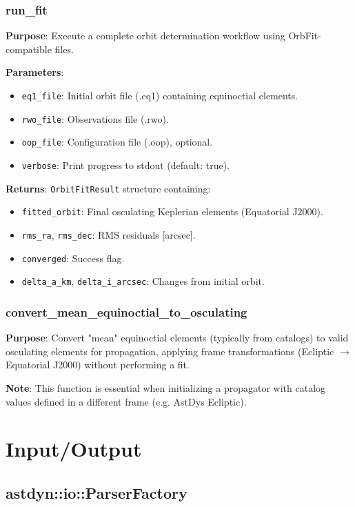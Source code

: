 \subsubsection{run\_fit}

\textbf{Purpose}: Execute a complete orbit determination workflow using OrbFit-compatible files.

\textbf{Parameters}:
\begin{itemize}
    \item \texttt{eq1\_file}: Initial orbit file (.eq1) containing equinoctial elements.
    \item \texttt{rwo\_file}: Observations file (.rwo).
    \item \texttt{oop\_file}: Configuration file (.oop), optional.
    \item \texttt{verbose}: Print progress to stdout (default: true).
\end{itemize}

\textbf{Returns}: \texttt{OrbitFitResult} structure containing:
\begin{itemize}
    \item \texttt{fitted\_orbit}: Final osculating Keplerian elements (Equatorial J2000).
    \item \texttt{rms\_ra}, \texttt{rms\_dec}: RMS residuals [arcsec].
    \item \texttt{converged}: Success flag.
    \item \texttt{delta\_a\_km}, \texttt{delta\_i\_arcsec}: Changes from initial orbit.
\end{itemize}

\subsubsection{convert\_mean\_equinoctial\_to\_osculating}

\textbf{Purpose}: Convert "mean" equinoctial elements (typically from catalogs) to valid osculating elements for propagation, applying frame transformations (Ecliptic $\to$ Equatorial J2000) without performing a fit.

\textbf{Note}: This function is essential when initializing a propagator with catalog values defined in a different frame (e.g. AstDys Ecliptic).

\section{Input/Output}

\subsection{astdyn::io::ParserFactory}

